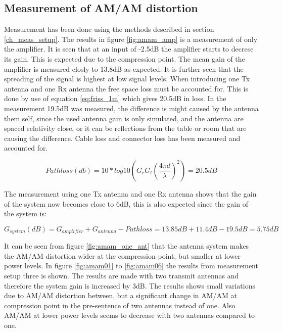 \subsection{Measurement of AM/AM distortion}\label{ch:meas_amam}
Measurement has been done using the methods described in section \ref{ch_meas_setup}. The results in figure \ref{fig:amam_amp} is a measurement of only the amplifier. It is seen that at an input of -2.5dB the amplifier starts to decrese its gain. This is expected due to the compression point. The mean gain of the amplifier is  measured closly to 13.8dB as expected. It is further seen that the spreading of the signal is highest at low signal levels. When introducing one Tx antenna and one Rx antenna the free space loss must be accounted for. This is done by use of equation \ref{eq:friss_1m} \citep{Balanis2005} which gives 20.5dB in loss. In the measurement 19.5dB was measured, the difference is might caused by the antenna them self, since the used antenna gain is only simulated, and the antenna are spaced relativity close, or it can be reflections from the table or room that are causing the difference. Cable loss and connector loss has been measured and accounted for.  

\begin{equation}\label{eq:friss_1m}
Pathloss(db) = 10*log10(G_r G_t (\frac{4\pi d}{\lambda})^2)=20.5dB
\end{equation}

The measurement using one Tx antenna and one Rx antenna shows that the gain of the system now becomes close to 6dB, this is also expected since the gain of the system is: 

\begin{equation}
G_{system}(dB) = G_{amplifier}+G_{antenna}-Pathloss = 13.85dB + 11.4dB -19.5dB = 5.75dB
\end{equation}

It can be seen from figure \ref{fig:amam_one_ant} that the antenna system makes the AM/AM distortion wider at the compression point, but smaller at lower power levels. In figure \ref{fig:amam01} to \ref{fig:amam06} the results from measurement setup three is shown. The results are made with two transmit antennas and therefore the system gain is increased by 3dB. The results shows small variations due to AM/AM distortion between, but a significant change in AM/AM at compression point in the pre-sentence of two antennas instead of one. Also AM/AM at lower power levels seems to decrease with two antennas compared to one. 

